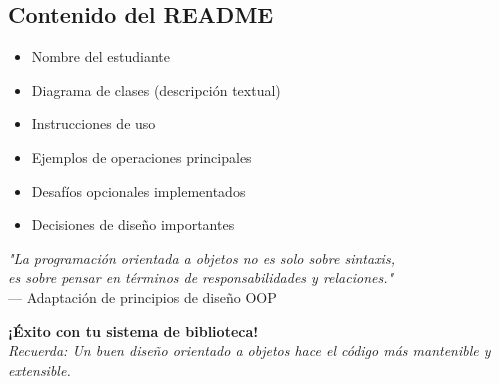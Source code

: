 \documentclass[11pt,letterpaper]{article}
\begin{document}
\subsection{Contenido del README}

\begin{itemize}
    \item Nombre del estudiante
    \item Diagrama de clases (descripción textual)
    \item Instrucciones de uso
    \item Ejemplos de operaciones principales
    \item Desafíos opcionales implementados
    \item Decisiones de diseño importantes
\end{itemize}

\vspace{1cm}

\begin{center}
\textit{"La programación orientada a objetos no es solo sobre sintaxis,}\\
\textit{es sobre pensar en términos de responsabilidades y relaciones."}\\
\vspace{0.3cm}
--- Adaptación de principios de diseño OOP
\end{center}

\vspace{0.5cm}

\begin{center}
\textbf{¡Éxito con tu sistema de biblioteca!}\\
\textit{Recuerda: Un buen diseño orientado a objetos hace el código más mantenible y extensible.}
\end{center}
\end{document}
